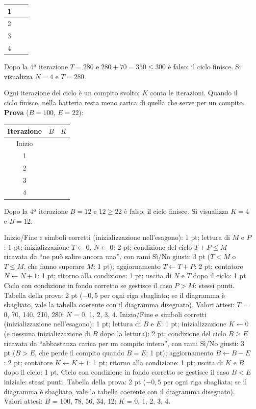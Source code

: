 \begin{esercizio}[14]
\begin{solution}
{\begin{center}
\begin{tabular}{|c|>{\centering\arraybackslash}p{2.5cm}|>{\centering\arraybackslash}p{2.5cm}|}
  1 & 70 & 1\\\hline
  2 & 140 & 2\\\hline
  3 & 210 & 3\\\hline
  4 & 280 & 4\\\hline
\end{tabular}\end{center}  Dopo la 4ª iterazione $T = 280$ e $280 + 70 = 350 \leq 300$ è falso: il ciclo finisce. Si visualizza $N = 4$ e $T = 280$.}{%
  Ogni iterazione del ciclo è un compito svolto: $K$ conta le iterazioni. Quando il ciclo finisce,
  nella batteria resta meno carica di quella che serve per un compito.\\[4pt]
  \textbf{Prova} ($B = 100$, $E = 22$):
\begin{center}\renewcommand{\arraystretch}{1.1}
\begin{tabular}{|c|>{\centering\arraybackslash}p{2.5cm}|>{\centering\arraybackslash}p{2.5cm}|}\hline
  Iterazione & $B$ & $K$\\\hline
  Inizio & 100 & 0\\\hline
  1 & 78 & 1\\\hline
  2 & 56 & 2\\\hline
  3 & 34 & 3\\\hline
  4 & 12 & 4\\\hline
\end{tabular}\end{center}  Dopo la 4ª iterazione $B = 12$ e $12 \geq 22$ è falso: il ciclo finisce. Si visualizza $K = 4$ e $B = 12$.}
  \criterioRR
  {Inizio/Fine e simboli corretti (inizializzazione nell'esagono): 1 pt; lettura di $M$ e $P$: 1 pt;
    inizializzazione $T\gets 0$, $N\gets 0$: 2 pt; condizione del ciclo $T+P\leq M$ ricavata da ``ne può
    salire ancora una'', con rami Sì/No giusti: 3 pt ($T<M$ o $T\leq M$, che fanno superare $M$: 1 pt);
    aggiornamento $T\gets T+P$: 2 pt; contatore $N\gets N+1$: 1 pt; ritorno alla condizione: 1 pt; uscita
    di $N$ e $T$ dopo il ciclo: 1 pt. Ciclo con condizione in fondo corretto se gestisce il caso $P>M$:
    stessi punti. Tabella della prova: 2 pt ($-0{,}5$ per ogni riga sbagliata; se il diagramma è sbagliato, vale la tabella coerente con il diagramma disegnato). Valori attesi: $T$ = 0, 70, 140, 210, 280; $N$ = 0, 1, 2, 3, 4.}
  {Inizio/Fine e simboli corretti (inizializzazione nell'esagono): 1 pt; lettura di $B$ e $E$: 1 pt;
    inizializzazione $K\gets 0$ (e nessuna inizializzazione di $B$ dopo la lettura): 2 pt; condizione del
    ciclo $B\geq E$ ricavata da ``abbastanza carica per un compito intero'', con rami Sì/No giusti:
    3 pt ($B>E$, che perde il compito quando $B=E$: 1 pt); aggiornamento $B\gets B-E$: 2 pt; contatore
    $K\gets K+1$: 1 pt; ritorno alla condizione: 1 pt; uscita di $K$ e $B$ dopo il ciclo: 1 pt. Ciclo con
    condizione in fondo corretto se gestisce il caso $B<E$ iniziale: stessi punti. Tabella della prova: 2 pt ($-0{,}5$ per ogni riga sbagliata; se il diagramma è sbagliato, vale la tabella coerente con il diagramma disegnato). Valori attesi: $B$ = 100, 78, 56, 34, 12; $K$ = 0, 1, 2, 3, 4.}
\end{solution}
\end{esercizio}
